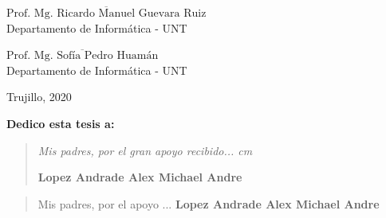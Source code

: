 \vskip 1cm
\begin{flushleft} 
$\overline{\mbox{Prof. Mg. Ricardo Manuel Guevara Ruiz}}$\\
\vskip -0.5cm
Departamento de Informática - UNT
\end{flushleft} 
\vskip 1cm
\begin{flushleft} 
$\overline{\mbox{Prof. Mg. Sofía Pedro Huamán}}$\\
\vskip -0.5cm
Departamento de Informática - UNT
\end{flushleft}
\vskip 0.8cm 
\begin{center}    
Trujillo, 2020
\end{center} 
\newpage

\newpage
 \pagestyle{plain}
 
 {\bf\Large {Dedico esta tesis a:}}
 \vskip 1cm
\begin{quotation}
{\it Mis padres, por el gran apoyo recibido...
 cm

\vskip 1cm
\textbf{Lopez Andrade Alex Michael Andre }}
\end{quotation}
\newpage

\newpage

 {\bf\Large {}}
 \vskip 1.5cm
 {\bf\Large {}}
\begin{quotation}
Mis padres, por el apoyo ...
\vskip 1cm
\textbf{Lopez Andrade Alex Michael Andre }  %
 \end{quotation}
 


